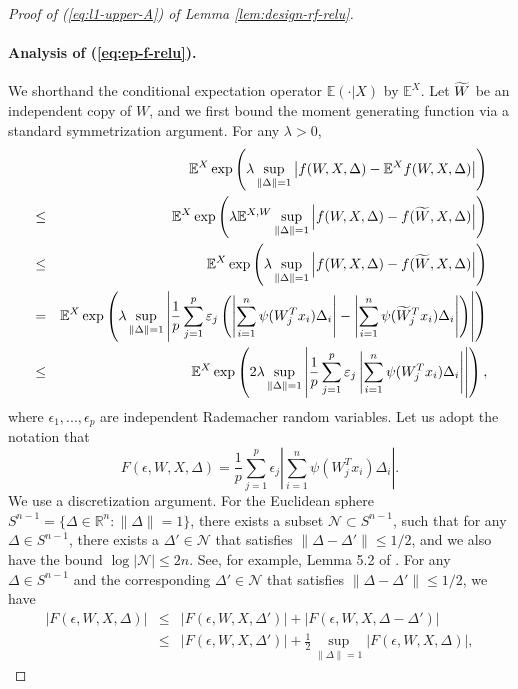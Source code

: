 \begin{proof}[Proof of (\ref{eq:l1-upper-A}) of Lemma \ref{lem:design-rf-relu}]
\paragraph{Analysis of (\ref{eq:ep-f-relu}).} We shorthand the conditional expectation operator $\mathbb{E}(\cdot|X)$ by $\mathbb{E}^X$. Let $\widetilde{W}$ be an independent copy of $W$, and we first bound the moment generating function via a standard symmetrization argument. For any $\lambda>0$,
\begin{eqnarray}
\nonumber && \mathbb{E}^X\exp\left(\lambda \sup_{\|\Delta\|=1}\left|f(W,X,\Delta)-\mathbb{E}^Xf(W,X,\Delta)\right|\right) \\
\nonumber &\leq& \mathbb{E}^X\exp\left(\lambda \mathbb{E}^{X,W}\sup_{\|\Delta\|=1}\left|f(W,X,\Delta)-f(\wt{W},X,\Delta)\right|\right) \\
\nonumber &\leq& \mathbb{E}^X\exp\left(\lambda \sup_{\|\Delta\|=1}\left|f(W,X,\Delta)-f(\wt{W},X,\Delta)\right|\right) \\
\nonumber &=& \mathbb{E}^X\exp\left(\lambda\sup_{\|\Delta\|=1}\left|\frac{1}{p}\sum_{j=1}^p\epsilon_j\left(\left|\sum_{i=1}^n\psi(W_j^Tx_i)\Delta_i\right|-\left|\sum_{i=1}^n\psi(\wt{W}_j^Tx_i)\Delta_i\right|\right)\right|\right) \\
\label{eq:mgf-b-relu} &\leq& \mathbb{E}^X\exp\left(2\lambda\sup_{\|\Delta\|=1}\left|\frac{1}{p}\sum_{j=1}^p\epsilon_j\left|\sum_{i=1}^n\psi(W_j^Tx_i)\Delta_i\right|\right|\right),
\end{eqnarray}
where $\epsilon_1,...,\epsilon_p$ are independent Rademacher random variables. Let us adopt the notation that
$$F(\epsilon,W,X,\Delta)=\frac{1}{p}\sum_{j=1}^p\epsilon_j\left|\sum_{i=1}^n\psi(W_j^Tx_i)\Delta_i\right|.$$
We use a discretization argument. For the Euclidean sphere $S^{n-1}=\{\Delta\in\mathbb{R}^n: \|\Delta\|=1\}$, there exists a subset $\mathcal{N}\subset S^{n-1}$, such that for any $\Delta\in S^{n-1}$, there exists a $\Delta'\in\mathcal{N}$ that satisfies $\|\Delta-\Delta'\|\leq 1/2$, and we also have the bound $\log|\mathcal{N}|\leq 2n$. See, for example, Lemma 5.2 of \cite{vershynin2010introduction}. 
For any $\Delta\in S^{n-1}$ and the corresponding $\Delta'\in\mathcal{N}$ that satisfies $\|\Delta-\Delta'\|\leq 1/2$, we have
\begin{eqnarray*}
|F(\epsilon,W,X,\Delta)| &\leq& |F(\epsilon,W,X,\Delta')| + |F(\epsilon,W,X,\Delta-\Delta')| \\
&\leq& |F(\epsilon,W,X,\Delta')| + \frac{1}{2}\sup_{\|\Delta\|=1}|F(\epsilon,W,X,\Delta)|,
\end{eqnarray*}

\end{proof}
